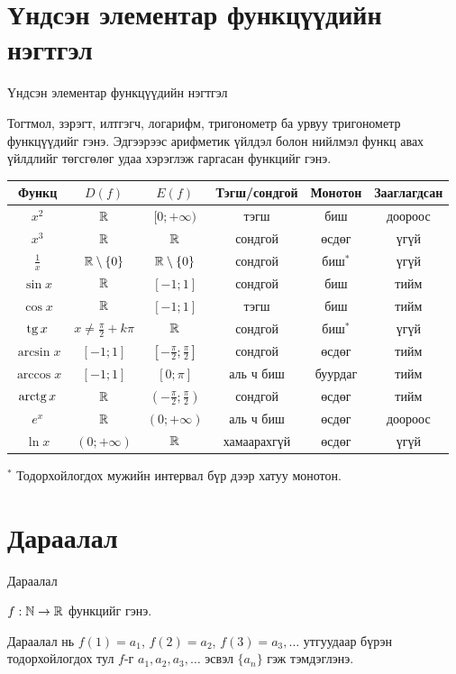\section{Үндсэн элементар функцүүдийн нэгтгэл}
\begin{frame}[allowframebreaks]{Үндсэн элементар функцүүдийн нэгтгэл}
\begin{definition}
Тогтмол, зэрэгт, илтгэгч, логарифм, тригонометр ба урвуу тригонометр функцүүдийг
 гэнэ. Эдгээрээс арифметик үйлдэл болон нийлмэл функц
авах үйлдлийг төгсгөлөг удаа хэрэглэж гаргасан функцийг  гэнэ.
\end{definition}

\begin{center}
\small
\renewcommand{\arraystretch}{1.4}
\begin{fitbox}\begin{tabular}{c|c|c|c|c|c}
Функц & $D(f)$ & $E(f)$ & Тэгш/сондгой & Монотон & Зааглагдсан\\\hline
$x^2$ & $\mathbb{R}$ & $[0;+\infty)$ & тэгш & биш & доороос\\
$x^3$ & $\mathbb{R}$ & $\mathbb{R}$ & сондгой & өсдөг & үгүй\\
$\frac1x$ & $\mathbb{R}\setminus\{0\}$ & $\mathbb{R}\setminus\{0\}$ & сондгой & биш$^{*}$ & үгүй\\\hline
$\sin x$ & $\mathbb{R}$ & $[-1;1]$ & сондгой & биш & тийм\\
$\cos x$ & $\mathbb{R}$ & $[-1;1]$ & тэгш & биш & тийм\\
$\operatorname{tg} x$ & $x\neq\frac{\pi}{2}+k\pi$ & $\mathbb{R}$ & сондгой & биш$^{*}$ & үгүй\\\hline
$\arcsin x$ & $[-1;1]$ & $\left[-\frac{\pi}{2};\frac{\pi}{2}\right]$ & сондгой & өсдөг & тийм\\
$\arccos x$ & $[-1;1]$ & $[0;\pi]$ & аль ч биш & буурдаг & тийм\\
$\operatorname{arctg} x$ & $\mathbb{R}$ & $\left(-\frac{\pi}{2};\frac{\pi}{2}\right)$ & сондгой & өсдөг & тийм\\\hline
$e^x$ & $\mathbb{R}$ & $(0;+\infty)$ & аль ч биш & өсдөг & доороос\\
$\ln x$ & $(0;+\infty)$ & $\mathbb{R}$ & хамаарахгүй & өсдөг & үгүй
\end{tabular}\end{fitbox}

\smallskip
{\footnotesize $^{*}$ Тодорхойлогдох мужийн интервал бүр дээр хатуу монотон.}
\end{center}
\end{frame}

\section{Дараалал}
\begin{frame}[allowframebreaks]{Дараалал}
\begin{definition}
$f:\mathbb{N}\to\mathbb{R}$ функцийг  гэнэ.
\end{definition}
Дараалал нь $f(1)=a_1$, $f(2)=a_2$, $f(3)=a_3,\ldots$ утгуудаар бүрэн тодорхойлогдох тул
$f$-г $a_1,a_2,a_3,\ldots$ эсвэл $\{a_n\}$ гэж тэмдэглэнэ.
\end{frame}


